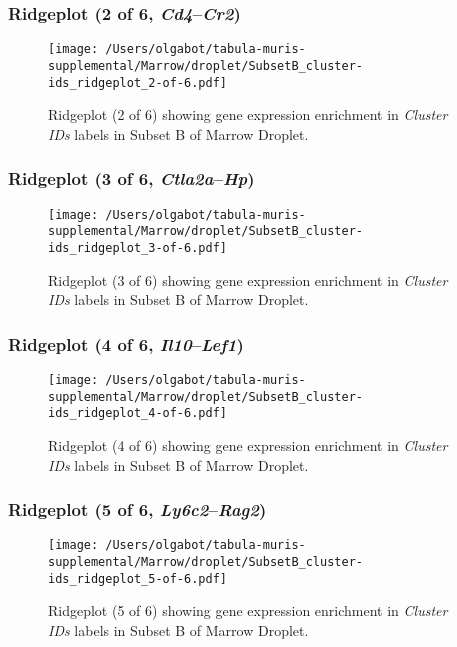 \clearpage

\subsubsection{Ridgeplot (2 of 6, \emph{Cd4}--\emph{Cr2})}
\begin{figure}[h]
\centering
\texttt{[image: /Users/olgabot/tabula-muris-supplemental/Marrow/droplet/SubsetB\_cluster-ids\_ridgeplot\_2-of-6.pdf]}

\caption{ Ridgeplot (2 of 6)  showing gene expression enrichment in \emph{Cluster IDs} labels in Subset B of Marrow Droplet. }
\end{figure}


\clearpage

\subsubsection{Ridgeplot (3 of 6, \emph{Ctla2a}--\emph{Hp})}
\begin{figure}[h]
\centering
\texttt{[image: /Users/olgabot/tabula-muris-supplemental/Marrow/droplet/SubsetB\_cluster-ids\_ridgeplot\_3-of-6.pdf]}

\caption{ Ridgeplot (3 of 6)  showing gene expression enrichment in \emph{Cluster IDs} labels in Subset B of Marrow Droplet. }
\end{figure}


\clearpage

\subsubsection{Ridgeplot (4 of 6, \emph{Il10}--\emph{Lef1})}
\begin{figure}[h]
\centering
\texttt{[image: /Users/olgabot/tabula-muris-supplemental/Marrow/droplet/SubsetB\_cluster-ids\_ridgeplot\_4-of-6.pdf]}

\caption{ Ridgeplot (4 of 6)  showing gene expression enrichment in \emph{Cluster IDs} labels in Subset B of Marrow Droplet. }
\end{figure}


\clearpage

\subsubsection{Ridgeplot (5 of 6, \emph{Ly6c2}--\emph{Rag2})}
\begin{figure}[h]
\centering
\texttt{[image: /Users/olgabot/tabula-muris-supplemental/Marrow/droplet/SubsetB\_cluster-ids\_ridgeplot\_5-of-6.pdf]}

\caption{ Ridgeplot (5 of 6)  showing gene expression enrichment in \emph{Cluster IDs} labels in Subset B of Marrow Droplet. }
\end{figure}


